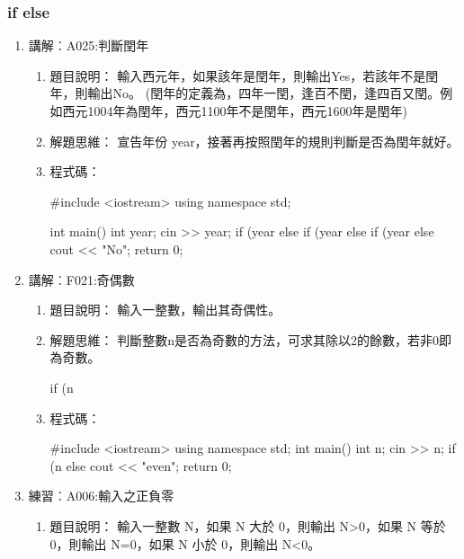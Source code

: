 \subsubsection{if else}
\begin{enumerate}
	\item 講解︰A025:判斷閏年%
		\begin{enumerate}
			\item 題目說明：
			\subitem 輸入西元年，如果該年是閏年，則輸出Yes，若該年不是閏年，則輸出No。 (閏年的定義為，四年一閏，逢百不閏，逢四百又閏。例如西元1004年為閏年，西元1100年不是閏年，西元1600年是閏年)
			
			\item 解題思維：
			\subitem 宣告年份 year，接著再按照閏年的規則判斷是否為閏年就好。
			
			\item 程式碼：
			\begin{cppcode}
				#include <iostream>
				using namespace std;
				
				int main()
				{
					int year;
					cin >> year;
					if (year%
					else if (year%
					else if (year%
					else cout << "No";
					return 0;
				}
			\end{cppcode}
		\end{enumerate}
		
	\item 講解︰F021:奇偶數%
		\begin{enumerate}
			\item 題目說明：
			\subitem 輸入一整數，輸出其奇偶性。
			
			\item 解題思維：
			\subitem 判斷整數n是否為奇數的方法，可求其除以2的餘數，若非0即為奇數。
			\begin{inside}
			if (n%
			\end{inside}
			
			\item 程式碼：
			\begin{cppcode}
				#include <iostream>
				using namespace std;
				int main()
				{
					int n;
					cin >> n;
					if (n%
					else cout << "even";
					return 0;
				}
			\end{cppcode}
		\end{enumerate}
	
	\item 練習︰A006:輸入之正負零%
		\begin{enumerate}
			\item 題目說明：
			\subitem 輸入一整數 N，如果 N 大於 0，則輸出 N>0，如果 N 等於 0，則輸出 N=0，如果 N 小於 0，則輸出 N<0。
			

\end{enumerate}
\end{enumerate}
